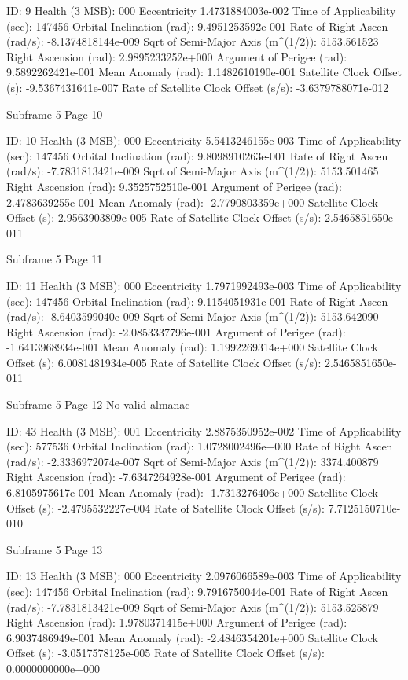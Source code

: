  ID:				      9
 Health (3 MSB):		     000
 Eccentricity			     1.4731884003e-002
 Time of Applicability (sec):	       147456
 Orbital Inclination (rad):	     9.4951253592e-001
 Rate of Right Ascen (rad/s):	     -8.1374818144e-009
 Sqrt of Semi-Major Axis (m^(1/2)):  5153.561523
 Right Ascension (rad): 	     2.9895233252e+000
 Argument of Perigee (rad):	     9.5892262421e-001
 Mean Anomaly (rad):		     1.1482610190e-001
 Satellite Clock Offset (s):	     -9.5367431641e-007
 Rate of Satellite Clock Offset (s/s): -3.6379788071e-012

 Subframe  5 Page 10

 ID:				     10
 Health (3 MSB):		     000
 Eccentricity			     5.5413246155e-003
 Time of Applicability (sec):	       147456
 Orbital Inclination (rad):	     9.8098910263e-001
 Rate of Right Ascen (rad/s):	     -7.7831813421e-009
 Sqrt of Semi-Major Axis (m^(1/2)):  5153.501465
 Right Ascension (rad): 	     9.3525752510e-001
 Argument of Perigee (rad):	     2.4783639255e-001
 Mean Anomaly (rad):		     -2.7790803359e+000
 Satellite Clock Offset (s):	     2.9563903809e-005
 Rate of Satellite Clock Offset (s/s): 2.5465851650e-011

 Subframe  5 Page 11

 ID:				     11
 Health (3 MSB):		     000
 Eccentricity			     1.7971992493e-003
 Time of Applicability (sec):	       147456
 Orbital Inclination (rad):	     9.1154051931e-001
 Rate of Right Ascen (rad/s):	     -8.6403599040e-009
 Sqrt of Semi-Major Axis (m^(1/2)):  5153.642090
 Right Ascension (rad): 	     -2.0853337796e-001
 Argument of Perigee (rad):	     -1.6413968934e-001
 Mean Anomaly (rad):		     1.1992269314e+000
 Satellite Clock Offset (s):	     6.0081481934e-005
 Rate of Satellite Clock Offset (s/s): 2.5465851650e-011

 Subframe  5 Page 12
No valid almanac

 ID:				     43
 Health (3 MSB):		     001
 Eccentricity			     2.8875350952e-002
 Time of Applicability (sec):	       577536
 Orbital Inclination (rad):	     1.0728002496e+000
 Rate of Right Ascen (rad/s):	     -2.3336972074e-007
 Sqrt of Semi-Major Axis (m^(1/2)):  3374.400879
 Right Ascension (rad): 	     -7.6347264928e-001
 Argument of Perigee (rad):	     6.8105975617e-001
 Mean Anomaly (rad):		     -1.7313276406e+000
 Satellite Clock Offset (s):	     -2.4795532227e-004
 Rate of Satellite Clock Offset (s/s): 7.7125150710e-010

 Subframe  5 Page 13

 ID:				     13
 Health (3 MSB):		     000
 Eccentricity			     2.0976066589e-003
 Time of Applicability (sec):	       147456
 Orbital Inclination (rad):	     9.7916750044e-001
 Rate of Right Ascen (rad/s):	     -7.7831813421e-009
 Sqrt of Semi-Major Axis (m^(1/2)):  5153.525879
 Right Ascension (rad): 	     1.9780371415e+000
 Argument of Perigee (rad):	     6.9037486949e-001
 Mean Anomaly (rad):		     -2.4846354201e+000
 Satellite Clock Offset (s):	     -3.0517578125e-005
 Rate of Satellite Clock Offset (s/s): 0.0000000000e+000

